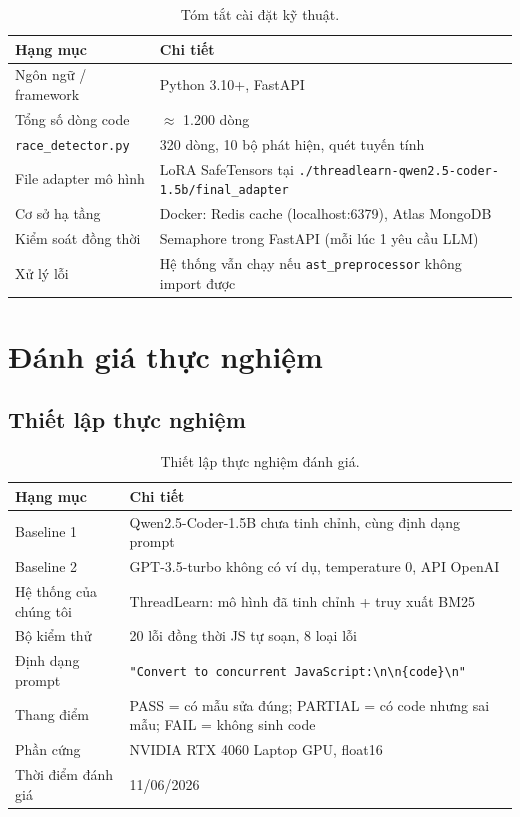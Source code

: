 \documentclass[12pt]{article}
\begin{document}
\begin{table}[ht]
  \centering
  \caption{Tóm tắt cài đặt kỹ thuật.}
  \label{tab:caidat}
  \begin{tabular}{@{}ll@{}}
    \toprule
    \textbf{Hạng mục} & \textbf{Chi tiết} \\
    \midrule
    Ngôn ngữ / framework   & Python 3.10+, FastAPI \\
    Tổng số dòng code       & $\approx$ 1.200 dòng \\
    \texttt{race\_detector.py} & 320 dòng, 10 bộ phát hiện, quét tuyến tính \\
    File adapter mô hình   & LoRA SafeTensors tại \texttt{./threadlearn-qwen2.5-coder-1.5b/final\_adapter} \\
    Cơ sở hạ tầng          & Docker: Redis cache (localhost:6379), Atlas MongoDB \\
    Kiểm soát đồng thời    & Semaphore trong FastAPI (mỗi lúc 1 yêu cầu LLM) \\
    Xử lý lỗi              & Hệ thống vẫn chạy nếu \texttt{ast\_preprocessor} không import được \\
    \bottomrule
  \end{tabular}
\end{table}

\section{Đánh giá thực nghiệm}
\label{sec:danhgia}

\subsection{Thiết lập thực nghiệm}

\begin{table}[ht]
  \centering
  \caption{Thiết lập thực nghiệm đánh giá.}
  \label{tab:thietlap}
  \begin{tabular}{@{}ll@{}}
    \toprule
    \textbf{Hạng mục} & \textbf{Chi tiết} \\
    \midrule
    Baseline 1       & Qwen2.5-Coder-1.5B chưa tinh chỉnh, cùng định dạng prompt \\
    Baseline 2       & GPT-3.5-turbo không có ví dụ, temperature 0, API OpenAI \\
    Hệ thống của chúng tôi & ThreadLearn: mô hình đã tinh chỉnh + truy xuất BM25 \\
    Bộ kiểm thử      & 20 lỗi đồng thời JS tự soạn, 8 loại lỗi \\
    Định dạng prompt & \texttt{"Convert to concurrent JavaScript:\textbackslash n\textbackslash n\{code\}\textbackslash n"} \\
    Thang điểm       & PASS = có mẫu sửa đúng; PARTIAL = có code nhưng sai mẫu; FAIL = không sinh code \\
    Phần cứng        & NVIDIA RTX 4060 Laptop GPU, float16 \\
    Thời điểm đánh giá & 11/06/2026 \\
    \bottomrule
  \end{tabular}
\end{table}
\end{document}
